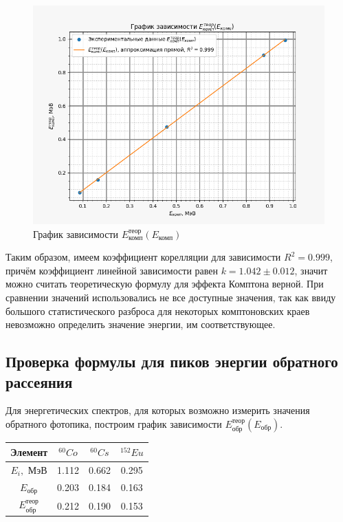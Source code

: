     \begin{figure}[H]
        \centering
        \includegraphics[width = 13 cm]{images/E_compton}
        \caption{График зависимости $E_{\text{комп}}^{\text{теор}}(E_{\text{комп}})$}
        \label{E_compton}
    \end{figure}

    Таким образом, имеем коэффициент корелляции для зависимости $R^2 = 0.999$, причём коэффициент линейной зависимости равен $k = 1.042 \pm 0.012$, значит можно считать теоретическую формулу для эффекта Комптона верной. При сравнении значений использовались не все доступные значения, так как ввиду большого статистического разброса для некоторых комптоновских краев невозможно определить значение энергии, им соответствующее.
    
\subsection{Проверка формулы для пиков энергии обратного рассеяния}

    Для энергетических спектров, для которых возможно измерить значения обратного фотопика, построим график зависимости $E_{\text{обр}}^{\text{теор}}(E_{\text{обр}})$.

    \begin{table}[H]
        \centering
        \begin{tabular}{|c|c|c|c|}
            \hline
            Элемент                        & $^{60}Co$ & $^{60}Cs$ & $^{152}Eu$ \\ \hline
            $E_i,$ МэВ                     & 1.112     & 0.662       & 0.295      \\ \hline
            $E_{\text{обр}}$               & 0.203     & 0.184       & 0.163      \\ \hline
            $E_{\text{обр}}^{\text{теор}}$ & 0.212     & 0.190       & 0.153      \\ \hline
        \end{tabular}
    \end{table}

